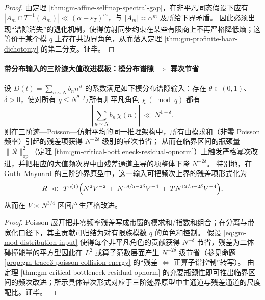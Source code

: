 \begin{proof}
由定理 \ref{thm:gm-affine-selfmap-spectral-gap}，在非平凡同态假设下应有 \(|A_m\cap T^{-1}(A_m)|\ll(\alpha-\varepsilon_T)^m\)，与 \(|A_m|\asymp \alpha^m\) 及所给下界矛盾。
因此必须出现“谱隙消失”的退化机制，使得仿射同步约束在某些有限商上不再严格降低熵；这等价于某个模 \(q\) 上存在共边界角色，从而落入定理 \ref{thm:gm-profinite-haar-dichotomy} 的第二分支。证毕。
\end{proof}

\paragraph{带分布输入的三阶迹大值改进模板：模分布谱隙 \texorpdfstring{$\Rightarrow$}{=>} 幂次节省}
\begin{theorem}\label{thm:gm-trace3-improvement-from-mod-distribution}
设 \(D(t)=\sum_{n\sim N} b_n n^{it}\) 的系数满足如下模分布谱隙输入：存在 \(\theta\in(0,1)\)、\(\delta>0\)，使对所有 \(q\le N^\theta\) 与所有非平凡角色 \(\chi\ (\bmod q)\) 都有
\begin{equation}\label{eq:gm-mod-distribution-input}
\left|\sum_{n\sim N} b_n\,\chi(n)\right|\ \ll\ N^{1-\delta}.
\end{equation}
则在三阶迹—Poisson—仿射平均的同一推理架构中，所有由模求和（非零 Poisson 频率）引起的残差项获得 \(N^{-2\delta}\) 级别的幂次节省；
从而在临界区间的瓶颈量 \(\|\mathcal{R}\|_{\mathrm{op}}^2\)（定理 \ref{thm:gm-critical-bottleneck-residual-opnorm}）上触发严格幂次改进，并把相应的大值频次界中由残差通道主导的项整体下降 \(N^{-2\delta}\)。
特别地，在 Guth--Maynard 的三阶迹界原型中，这一输入可把频次上界的残差项形式化为
\[
R\ \ll\ T^{o(1)}
\Bigl(
N^2V^{-2}
\,+\,N^{18/5-2\delta}V^{-4}
\,+\,TN^{12/5-2\delta}V^{-4}
\Bigr),
\]
从而在 \(V\asymp N^{3/4}\) 区间产生严格改进。
\end{theorem}

\begin{proof}
Poisson 展开把非零频率残差写成带窗的模求和/指数和组合；在分离与带宽化口径下，其主贡献可归结为对有限族模数 \(q\) 的角色和控制。
假设 \eqref{eq:gm-mod-distribution-input} 使得每个非平凡角色的贡献获得 \(N^{-\delta}\) 节省，残差为二体碰撞能量的平方型因此在 \(L^2\) 或算子范数层面产生 \(N^{-2\delta}\) 级节省（参见命题 \ref{prop:gm-trace3-poisson-collision-energy} 的“残差 \(\Leftrightarrow\) 正算子谱控制”转写）。
由定理 \ref{thm:gm-critical-bottleneck-residual-opnorm} 的充要瓶颈性即可推出临界区间的频次改进；所示具体幂次形式对应于三阶迹界原型中主通道与残差通道的尺度配比。证毕。
\end{proof}

\endinput
